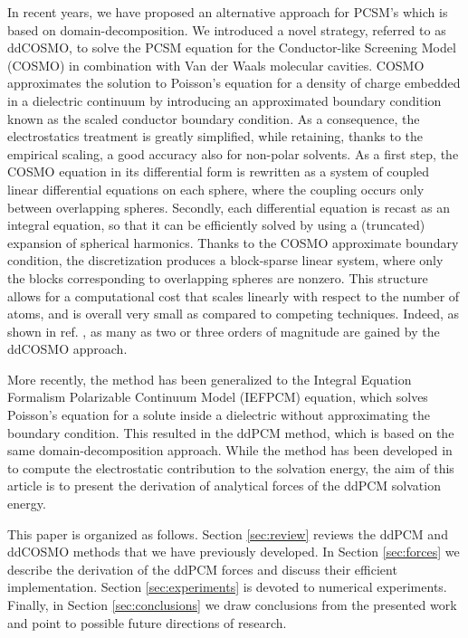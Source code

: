 \documentclass[aip,jcp,a4paper,11pt]{revtex4-1}
\begin{document}
In recent years, we have proposed an alternative approach for PCSM's which is based on  domain-decomposition. We introduced a novel strategy\cite{Cances_JCP_ddCOSMO}, referred to as ddCOSMO\cite{Cances_JCP_ddCOSMO,Lipparini_JCTC_ddCOSMO,Lipparini_JPCL_ddCOSMO,Lipparini_JCP_ddCOSMO-QM}, to solve the PCSM equation for the Conductor-like Screening Model\cite{Klamt_JCS_Cosmo} (COSMO) in combination with Van der Waals molecular cavities. \color{red}COSMO approximates the solution to Poisson's equation for a density of charge embedded in a dielectric continuum by introducing an approximated boundary condition known as the scaled conductor boundary condition. As a consequence, the electrostatics treatment is greatly simplified, while retaining, thanks to the empirical scaling, a good accuracy also for non-polar solvents\cite{Klamt_JCTC_COSMOBench}.\color{black}
As a first step, the COSMO equation in its differential form is rewritten as a system of coupled linear differential equations on each sphere, where the coupling occurs only between overlapping spheres. Secondly, each differential equation is recast as an integral equation, so that it can be efficiently solved by using a (truncated) expansion of spherical harmonics\cite{Cances_JCP_ddCOSMO}. \color{red}Thanks to the COSMO approximate boundary condition,\color{black} the discretization produces a block-sparse linear system\cite{Lipparini_JCTC_ddCOSMO}, where only the blocks corresponding to overlapping spheres are nonzero. This structure allows for a computational cost that scales linearly with respect to the number of atoms, and is overall very small as compared to competing techniques. Indeed, as shown in ref. , as many as two or three orders of magnitude are gained by the ddCOSMO approach.

More recently, the method has been generalized to the Integral Equation Formalism Polarizable Continuum Model (IEFPCM) equation\cite{Mennucci_JCP_IEF1,Mennucci_JMC_IEF2,Mennucci_JPCB_IEF3}, \color{red}which solves Poisson's equation for a solute inside a dielectric without approximating the boundary condition.\color{black} This resulted in the ddPCM method\cite{Stamm_JCP_DDPCM}, which is based on the same domain-decomposition approach. 
While the method has been developed in \cite{Stamm_JCP_DDPCM} to compute the electrostatic contribution to the solvation energy, the aim of this article is to present the derivation of analytical forces of the ddPCM solvation energy.

This paper is organized as follows. Section \ref{sec:review} reviews the ddPCM and ddCOSMO methods that we have previously developed. In Section \ref{sec:forces} we describe the derivation of the ddPCM forces and discuss their efficient implementation. Section \ref{sec:experiments} is devoted to numerical experiments. Finally, in Section \ref{sec:conclusions} we draw conclusions from the presented work and point to possible future directions of research.
\end{document}
